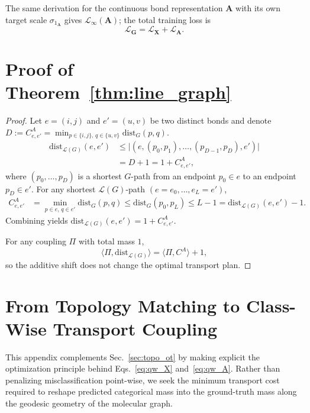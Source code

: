 The same derivation for the continuous bond representation $\mathbf{A}$ with its own target scale
$\sigma_{1_\mathbf{A}}$ gives $\mathcal{L}_{\infty}(\mathbf{A})$; the total training loss is
\[
\mathcal{L}_{\mathbf{G}} = \mathcal{L}_{\mathbf{X}} + \mathcal{L}_{\mathbf{A}}.
\]


\section{Proof of Theorem~\ref{thm:line_graph}}
\label{app:qw:edge_cost}

\begin{proof}
Let $e=(i,j)$ and $e'=(u,v)$ be two distinct bonds and denote
$D:=C^{A}_{e,e'}=\min_{p\in\{i,j\},\,q\in\{u,v\}}\mathrm{dist}_G(p,q)$.
\begin{align}
\mathrm{dist}_{\mathcal{L}(G)}(e,e')
&\le
\big|(e,(p_0,p_1),\ldots,(p_{D-1},p_D),e')\big|
\\
&=
D+1
=
1+C^{A}_{e,e'},
\end{align}
where $(p_0,\ldots,p_D)$ is a shortest $G$-path from an endpoint $p_0\in e$ to an endpoint $p_D\in e'$.
For any shortest $\mathcal{L}(G)$-path $(e=e_0,\ldots,e_L=e')$,
\begin{align}
C^{A}_{e,e'}
&=
\min_{p\in e,\,q\in e'}\mathrm{dist}_G(p,q)
\le
\mathrm{dist}_G(p_0,p_L)
\le
L-1
=
\mathrm{dist}_{\mathcal{L}(G)}(e,e')-1 .
\end{align}
Combining yields $\mathrm{dist}_{\mathcal{L}(G)}(e,e')=1+C^{A}_{e,e'}$.

For any coupling $\Pi$ with total mass $1$,
\begin{equation}
\langle \Pi,\mathrm{dist}_{\mathcal{L}(G)}\rangle
=
\langle \Pi,C^{A}\rangle + 1,
\end{equation}
so the additive shift does not change the optimal transport plan.
\end{proof}


\section{From Topology Matching to Class-Wise Transport Coupling}
\label{app:qw:derivation}

This appendix complements Sec.~\ref{sec:topo_ot} by making explicit the optimization principle behind Eqs.~\eqref{eq:qw_X} and~\eqref{eq:qw_A}. Rather than penalizing misclassification point-wise, we seek the minimum transport cost required to reshape predicted categorical mass into the ground-truth mass along the geodesic geometry of the molecular graph.

